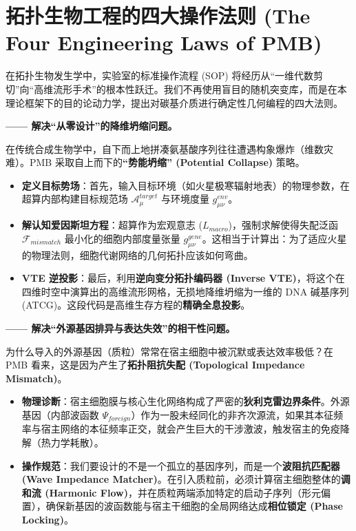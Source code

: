 \section{拓扑生物工程的四大操作法则 (The Four Engineering Laws of PMB)}
\label{sec:tb_engineering_laws}

在拓扑生物发生学中，实验室的标准操作流程 (SOP) 将经历从“一维代数剪切”向“高维流形手术”的根本性跃迁。我们不再使用盲目的随机突变库，而是在本理论框架下的目的论动力学，提出对碳基介质进行确定性几何编程的四大法则。


\textbf{—— 解决“从零设计”的降维坍缩问题。}

在传统合成生物学中，自下而上地拼凑氨基酸序列往往遭遇构象爆炸（维数灾难）。PMB 采取自上而下的\textbf{“势能坍缩” (Potential Collapse)} 策略。

\begin{itemize}
    \item \textbf{定义目标势场}：首先，输入目标环境（如火星极寒辐射地表）的物理参数，在超算内部构建目标规范场 $\mathcal{A}_\mu^{target}$ 与环境度量 $g_{\mu\nu}^{env}$。
    \item \textbf{解认知爱因斯坦方程}：超算作为宏观意志 ($L_{macro}$)，强制求解使得失配泛函 $\mathcal{F}_{mismatch}$ 最小化的细胞内部度量张量 $g_{\mu\nu}^{gene}$。这相当于计算出：为了适应火星的物理法则，细胞代谢网络的几何拓扑应该如何弯曲。
    \item \textbf{VTE 逆投影}：最后，利用\textbf{逆向变分拓扑编码器 (Inverse VTE)}，将这个在四维时空中演算出的高维流形网格，无损地降维坍缩为一维的 DNA 碱基序列 (ATCG)。这段代码是高维生存方程的\textbf{精确全息投影}。
\end{itemize}


\textbf{—— 解决“外源基因排异与表达失效”的相干性问题。}

为什么导入的外源基因（质粒）常常在宿主细胞中被沉默或表达效率极低？在 PMB 看来，这是因为产生了\textbf{拓扑阻抗失配 (Topological Impedance Mismatch)}。

\begin{itemize}
    \item \textbf{物理诊断}：宿主细胞膜与核心生化网络构成了严密的\textbf{狄利克雷边界条件}。外源基因（内部波函数 $\Psi_{foreign}$）作为一股未经同化的非齐次源流，如果其本征频率与宿主网络的本征频率正交，就会产生巨大的干涉激波，触发宿主的免疫降解（热力学耗散）。
    \item \textbf{操作规范}：我们要设计的不是一个孤立的基因序列，而是一个\textbf{波阻抗匹配器 (Wave Impedance Matcher)}。在引入质粒前，必须计算宿主细胞整体的\textbf{调和流 (Harmonic Flow)}，并在质粒两端添加特定的启动子序列（形元偏置），确保新基因的波函数能与宿主干细胞的全局网络达成\textbf{相位锁定 (Phase Locking)}。
\end{itemize}

